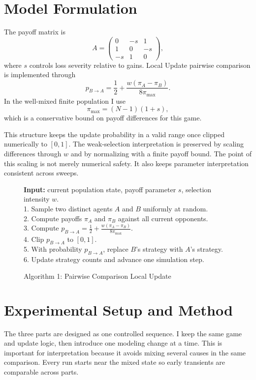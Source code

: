 \documentclass[11pt,a4paper]{article}
\begin{document}
\section{Model Formulation}
The payoff matrix is
\begin{equation}
A=\begin{pmatrix}
0 & -s & 1 \\
1 & 0 & -s \\
-s & 1 & 0
\end{pmatrix},
\end{equation}
where $s$ controls loss severity relative to gains. Local Update pairwise comparison is implemented through
\begin{equation}
p_{B\to A}=\frac{1}{2}+\frac{w(\pi_A-\pi_B)}{8\pi_{\max}}.
\end{equation}
In the well-mixed finite population I use
\begin{equation}
\pi_{\max}=(N-1)(1+s),
\end{equation}
which is a conservative bound on payoff differences for this game.

This structure keeps the update probability in a valid range once clipped numerically to $[0,1]$. The weak-selection interpretation is preserved by scaling differences through $w$ and by normalizing with a finite payoff bound. The point of this scaling is not merely numerical safety. It also keeps parameter interpretation consistent across sweeps.

\begin{figure}[!htbp]
\centering
\caption{Algorithm 1: Pairwise Comparison Local Update}
\begin{minipage}{0.92\textwidth}
\small
\textbf{Input:} current population state, payoff parameter $s$, selection intensity $w$.\\
1. Sample two distinct agents $A$ and $B$ uniformly at random.\\
2. Compute payoffs $\pi_A$ and $\pi_B$ against all current opponents.\\
3. Compute $p_{B\to A}=\frac{1}{2}+\frac{w(\pi_A-\pi_B)}{8\pi_{\max}}$.\\
4. Clip $p_{B\to A}$ to $[0,1]$.\\
5. With probability $p_{B\to A}$, replace $B$'s strategy with $A$'s strategy.\\
6. Update strategy counts and advance one simulation step.
\end{minipage}
\end{figure}

\section{Experimental Setup and Method}
The three parts are designed as one controlled sequence. I keep the same game and update logic, then introduce one modeling change at a time. This is important for interpretation because it avoids mixing several causes in the same comparison. Every run starts near the mixed state so early transients are comparable across parts.
\end{document}
